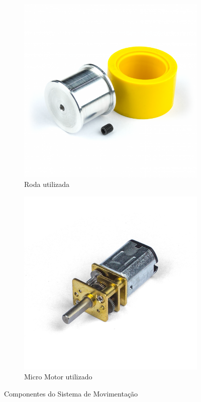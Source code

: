 \begin{figure}[htbp]
\centering
\begin{subfigure}{0.25\textwidth}
  \centering
  \includegraphics[width=.9\linewidth]{capitulos/imagens/roda_sep.png}
  \caption{Roda utilizada}
  \label{fig:roda}
\end{subfigure}%
\begin{subfigure}{0.25\textwidth}
  \centering
  \includegraphics[width=.9\linewidth]{capitulos/imagens/motor.png}
  \caption{Micro Motor utilizado}
  \label{fig:motor}
\end{subfigure}
\caption{Componentes do Sistema de Movimentação}
\label{fig:sist_moviment}
\end{figure}



